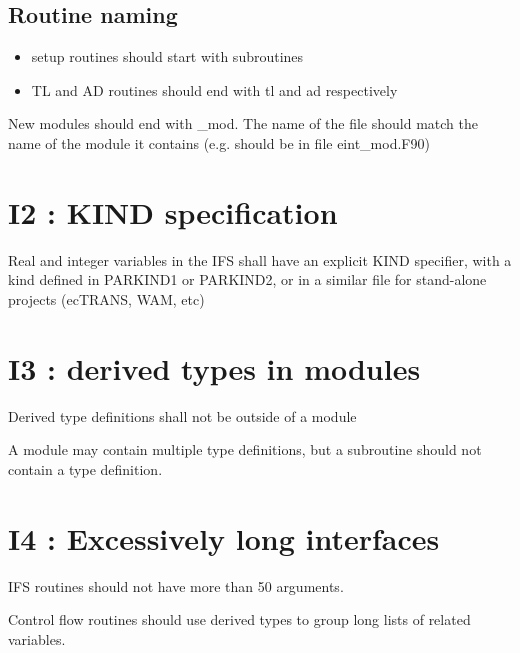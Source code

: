 \documentclass[letterpaper,10pt,english]{sphinxmanual}
\begin{document}
\subsection{Routine naming}
\label{\detokenize{rules/I1:routine-naming}}\begin{itemize}
\item {} 
setup routines should start with subroutines

\item {} 
TL and AD routines should end with tl and ad respectively

\end{itemize}

New modules should end with \_mod. The name of the file should match
the name of the module it contains (e.g.  should be in file eint\_mod.F90)


\section{I2 : KIND specification}
\label{\detokenize{rules/I2:i2-kind-specification}}\label{\detokenize{rules/I2::doc}}
Real and integer variables in the IFS shall have an explicit KIND specifier, with
a kind defined in PARKIND1 or PARKIND2, or in a similar file for stand-alone projects
(ecTRANS, WAM, etc)


\section{I3 : derived types in modules}
\label{\detokenize{rules/I3:i3-derived-types-in-modules}}\label{\detokenize{rules/I3::doc}}
Derived type definitions shall not be outside of a module

A module may contain multiple type definitions, but a subroutine should
not contain a type definition.


\section{I4 : Excessively long interfaces}
\label{\detokenize{rules/I4:i4-excessively-long-interfaces}}\label{\detokenize{rules/I4::doc}}
IFS routines should not have more than 50  arguments.

Control flow routines should use derived types to group long lists of related variables.
\end{document}
